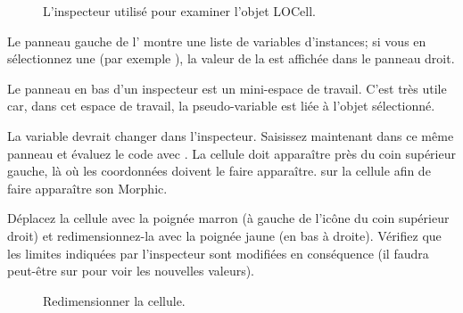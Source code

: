 \documentclass[a4paper,10pt,twoside]{book}
\begin{document}
\begin{figure}[htbp]
   \centering
   \caption{L'inspecteur utilisé pour examiner l'objet LOCell.}
\end{figure}

Le panneau gauche de l' montre une liste de variables
d'instances; si vous en sélectionnez une (par exemple
\mbox{),} la valeur de la  est
affichée dans le panneau droit. %


Le panneau en bas d'un inspecteur est un mini-espace de
travail. C'est très utile car, dans cet espace de travail, la
  pseudo-variable \self{} est liée à l'objet sélectionné.


La variable  devrait changer dans l'inspecteur. 
Saisissez maintenant  dans
  ce même panneau et évaluez le code avec . La cellule
  doit apparaître près du coin supérieur gauche, là où les coordonnées
   doivent le faire apparaître.
\Metaclickz{} sur la cellule afin de faire apparaître son
 Morphic.

Déplacez la cellule avec la poignée marron (à 
gauche de l'icône du coin supérieur droit) et redimensionnez-la avec la poignée jaune (en bas à droite).
Vérifiez que les limites indiquées par l'inspecteur sont modifiées en
conséquence (il faudra peut-être \actclick{} sur  pour voir les nouvelles valeurs). %

\begin{figure}[htbp]
\centering
\caption{Redimensionner la cellule.}
\end{figure}
\end{document}
